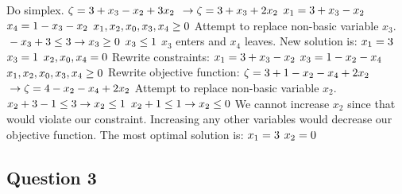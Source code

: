 \documentclass{article}
\begin{document}
\newline Do simplex.
$\\\zeta = 3 + x_3 - x_2 + 3x_2$
$\\\to \zeta = 3 + x_3 + 2x_2$
$\\ x_1 = 3 + x_3 - x_2$
$\\ x_4 = 1 - x_3 - x_2$
$\\ x_1, x_2, x_0, x_3, x_4 \geq 0$
\newline Attempt to replace non-basic variable $x_3$.
$\\-x_3 + 3 \leq 3 \to x_3 \geq 0$
$\\x_3 \leq 1$
\newline $x_3$ enters and $x_4$ leaves.
\newline New solution is:
$\\x_1 = 3$
$\\x_3 = 1$
$\\x_2, x_0, x_4 = 0$
\newline Rewrite constraints:
$\\ x_1 = 3 + x_3 - x_2$
$\\ x_3 = 1 - x_2 - x_4$
$\\ x_1, x_2, x_0, x_3, x_4 \geq 0$
\newline Rewrite objective function:
$\\\zeta = 3 + 1 - x_2 - x_4 + 2x_2$
$\\\to \zeta = 4 - x_2 - x_4 + 2x_2$
\newline Attempt to replace non-basic variable $x_2$.
$\\ x_2 + 3 - 1 \leq 3 \to x_2 \leq 1$
$\\ x_2 + 1 \leq 1 \to x_2 \leq 0$
\newline We cannot increase $x_2$ since that would violate our constraint. Increasing any other variables would decrease our objective function. The most optimal solution is:
$\\x_1 = 3$
$\\x_2 = 0$


\newpage
\subsection*{Question 3}

\newpage
\end{document}
